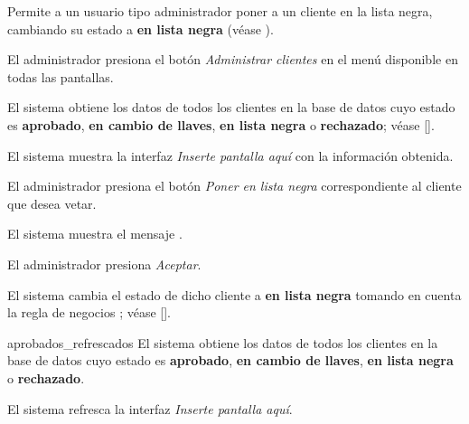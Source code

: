 %
%

{
  Permite a un usuario tipo administrador poner a un cliente en la lista negra,
  cambiando su estado a \textbf{en lista negra} (véase
  ).

  \begin{trayectoriaPrincipal}

    \item El administrador presiona el botón \textit{Administrar clientes}
      en el menú disponible en todas las pantallas.

    \item El sistema obtiene los datos de todos los clientes en la base de datos
      cuyo estado es \textbf{aprobado}, \textbf{en cambio de llaves},
      \textbf{en lista negra} o \textbf{rechazado}; véase
      [].

    \item El sistema muestra la interfaz \textit{Inserte pantalla aquí} con la
      información obtenida.

    \item El administrador presiona el botón \textit{Poner en lista negra}
      correspondiente al cliente que desea vetar.

    \item El sistema muestra el mensaje .

    \item El administrador presiona \textit{Aceptar}.

    \item El sistema cambia el estado de dicho cliente a \textbf{en lista negra}
      tomando en cuenta la regla de negocios ;
      véase [].

    \item [aprobados_refrescados] El sistema obtiene los datos de todos los
      clientes en la base de datos cuyo estado es \textbf{aprobado},
      \textbf{en cambio de llaves}, \textbf{en lista negra} o
      \textbf{rechazado}.

    \item El sistema refresca la interfaz \textit{Inserte pantalla aquí}.

  \end{trayectoriaPrincipal}

}
